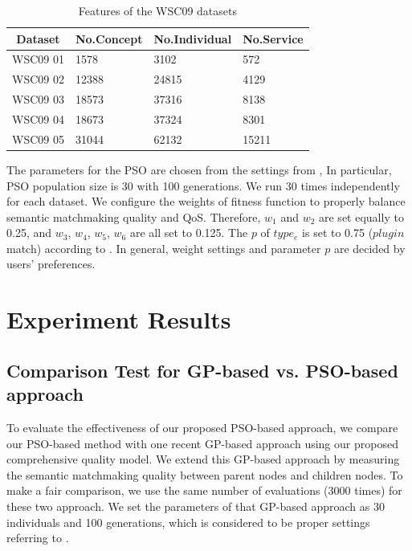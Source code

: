\begin{table}[]
\centering
\caption{Features of the WSC09 datasets}
\label{wsc09datasetTable}
\begin{tabular}{l|l|l|l}
\hline
\multicolumn{1}{c|}{Dataset} & No.Concept & No.Individual & No.Service \\ \hline
WSC09 01                     & 1578       &3102           &572      \\ \hline
WSC09 02                     & 12388      &24815          &4129      \\ \hline
WSC09 03                     & 18573      &37316          &8138      \\ \hline
WSC09 04                     & 18673      &37324          &8301      \\ \hline
WSC09 05                     & 31044      &62132          &15211    \\ \hline
\end{tabular}
\end{table}


The parameters for the PSO are chosen from the settings from \cite{shi2001particle}, In particular, PSO population size is 30 with 100 generations. We run 30 times independently for each dataset. We configure the weights of fitness function to properly balance semantic matchmaking quality and QoS. Therefore, $w_{1}$ and $w_{2}$ are set equally to 0.25, and $w_{3}$, $w_{4}$, $w_{5}$, $w_{6}$ are all set to 0.125. The $p$ of $type_e$ is set to 0.75 ($plugin$ match) according to \cite{lecue2009optimizing}. In general, weight settings and parameter $p$ are decided by users' preferences.
\vspace{-0.5cm}

\section{Experiment Results}\label{experiment_results}


\subsection{Comparison Test for GP-based vs. PSO-based approach}\label{comparisonTestWithGP}
To evaluate the effectiveness of our proposed PSO-based approach, we compare our PSO-based method with one recent GP-based approach \cite{ma2015hybrid} using our proposed comprehensive quality model. We extend this GP-based approach by measuring the semantic matchmaking quality between parent nodes and children nodes. To make a fair comparison, we use the same number of evaluations (3000 times) for these two approach. We set the parameters of that GP-based approach as 30 individuals and 100 generations, which is considered to be proper settings referring to \cite{da2015gp}.


